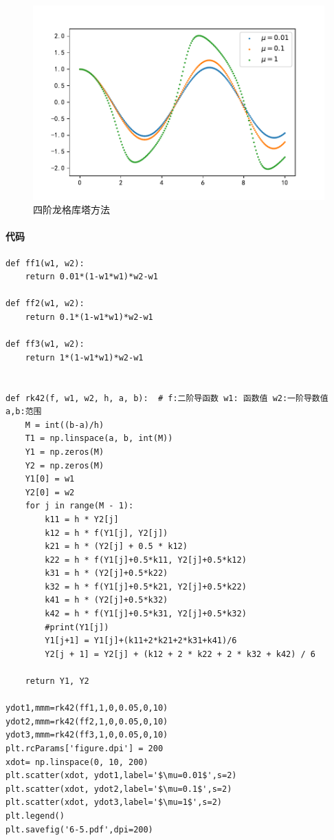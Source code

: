 \begin{figure}[H]
	\centering
	\caption{四阶龙格库塔方法}
	\includegraphics[width=\linewidth]{6-5.pdf}
\end{figure}

\paragraph{代码}


\begin{verbatim}
def ff1(w1, w2):
    return 0.01*(1-w1*w1)*w2-w1

def ff2(w1, w2):
    return 0.1*(1-w1*w1)*w2-w1

def ff3(w1, w2):
    return 1*(1-w1*w1)*w2-w1


def rk42(f, w1, w2, h, a, b):  # f:二阶导函数 w1: 函数值 w2:一阶导数值 a,b:范围
    M = int((b-a)/h)
    T1 = np.linspace(a, b, int(M))
    Y1 = np.zeros(M)
    Y2 = np.zeros(M)
    Y1[0] = w1
    Y2[0] = w2
    for j in range(M - 1):
        k11 = h * Y2[j]
        k12 = h * f(Y1[j], Y2[j])
        k21 = h * (Y2[j] + 0.5 * k12)
        k22 = h * f(Y1[j]+0.5*k11, Y2[j]+0.5*k12)
        k31 = h * (Y2[j]+0.5*k22)
        k32 = h * f(Y1[j]+0.5*k21, Y2[j]+0.5*k22)
        k41 = h * (Y2[j]+0.5*k32)
        k42 = h * f(Y1[j]+0.5*k31, Y2[j]+0.5*k32)
        #print(Y1[j])
        Y1[j+1] = Y1[j]+(k11+2*k21+2*k31+k41)/6
        Y2[j + 1] = Y2[j] + (k12 + 2 * k22 + 2 * k32 + k42) / 6

    return Y1, Y2

ydot1,mmm=rk42(ff1,1,0,0.05,0,10)
ydot2,mmm=rk42(ff2,1,0,0.05,0,10)
ydot3,mmm=rk42(ff3,1,0,0.05,0,10)
plt.rcParams['figure.dpi'] = 200
xdot= np.linspace(0, 10, 200)
plt.scatter(xdot, ydot1,label='$\mu=0.01$',s=2)
plt.scatter(xdot, ydot2,label='$\mu=0.1$',s=2)
plt.scatter(xdot, ydot3,label='$\mu=1$',s=2)
plt.legend()
plt.savefig('6-5.pdf',dpi=200)

\end{verbatim}


